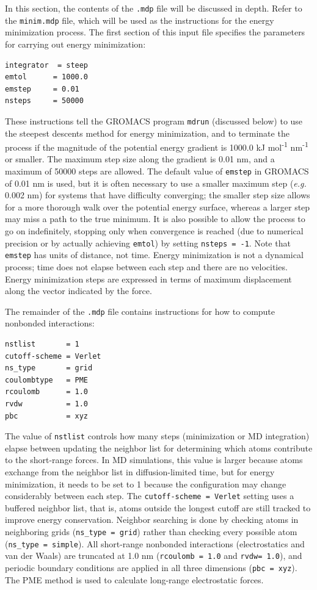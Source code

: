 \documentclass[9pt,tutorial]{livecoms}
\begin{document}
In this section, the contents of the \texttt{.mdp} file will be discussed in depth. Refer to the \texttt{minim.mdp} file, which will be used as the instructions for the energy minimization process. The first section of this input file specifies the parameters for carrying out energy minimization:

\begin{verbatim}
integrator	= steep
emtol      = 1000.0
emstep     = 0.01
nsteps     = 50000
\end{verbatim}

These instructions tell the GROMACS program \texttt{mdrun} (discussed below) to use the steepest descents method for energy minimization, and to terminate the process if the magnitude of the potential energy gradient is 1000.0 kJ mol\textsuperscript{-1} nm\textsuperscript{-1} or smaller. The maximum step size along the gradient is 0.01 nm, and a maximum of 50000 steps are allowed. The default value of \texttt{emstep} in GROMACS of 0.01 nm is used, but it is often necessary to use a smaller maximum step ({\em e.g.} 0.002 nm) for systems that have difficulty converging; the smaller step size allows for a more thorough walk over the potential energy surface, whereas a larger step may miss a path to the true minimum. It is also possible to allow the process to go on indefinitely, stopping only when convergence is reached (due to numerical precision or by actually achieving \texttt{emtol}) by setting \texttt{nsteps = -1}. Note that \texttt{emstep} has units of distance, not time. Energy minimization is not a dynamical process; time does not elapse between each step and there are no velocities. Energy minimization steps are expressed in terms of maximum displacement along the vector indicated by the force.

The remainder of the \texttt{.mdp} file contains instructions for how to compute nonbonded interactions:

\begin{verbatim}
nstlist       = 1
cutoff-scheme = Verlet
ns_type       = grid
coulombtype   = PME
rcoulomb      = 1.0
rvdw          = 1.0
pbc           = xyz
\end{verbatim}

The value of \texttt{nstlist} controls how many steps (minimization or MD integration) elapse between updating the neighbor list for determining which atoms contribute to the short-range forces. In MD simulations, this value is larger because atoms exchange from the neighbor list in diffusion-limited time, but for energy minimization, it needs to be set to 1 because the configuration may change considerably between each step. The \texttt{cutoff-scheme = Verlet} setting uses a buffered neighbor list, that is, atoms outside the longest cutoff are still tracked to improve energy conservation. Neighbor searching is done by checking atoms in neighboring grids (\texttt{ns\_type = grid}) rather than checking every possible atom (\texttt{ns\_type = simple}). All short-range nonbonded interactions (electrostatics and van der Waals) are truncated at 1.0 nm (\texttt{rcoulomb = 1.0} and \texttt{rvdw= 1.0}), and periodic boundary conditions are applied in all three dimensions (\texttt{pbc = xyz}). The PME method is used to calculate long-range electrostatic forces.
\end{document}
